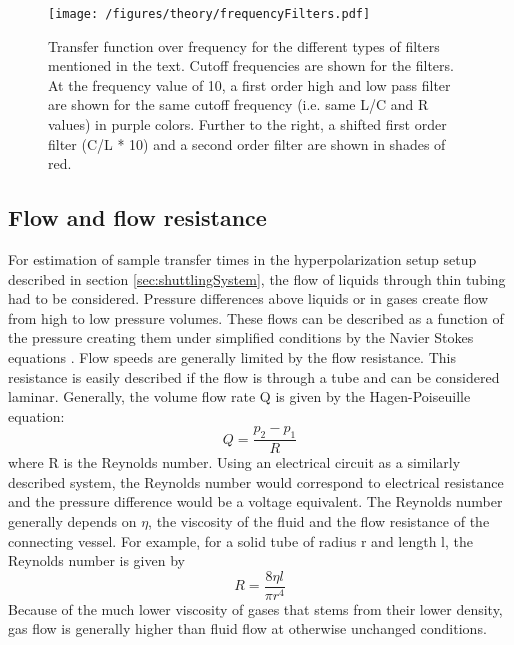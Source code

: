             \begin{figure}
                \centering
                \texttt{[image: /figures/theory/frequencyFilters.pdf]}
                \caption[Frequency filters]{Transfer function over frequency for the different types of filters mentioned in the text. Cutoff frequencies are shown for the filters. At the frequency value of 10, a first order high and low pass filter are shown for the same cutoff frequency (i.e. same L/C and R values) in purple colors. Further to the right, a shifted first order filter (C/L * 10) and a second order filter are shown in shades of red.}
                \label{figure:theory:frequencyFilter}
            \end{figure}
            \subsection{Flow and flow resistance}
                For estimation of sample transfer times in the hyperpolarization setup setup described in section \ref{sec:shuttlingSystem}, the flow of liquids through thin tubing had to be considered.
                Pressure differences above liquids or in gases create flow from high to low pressure volumes. These flows can be   described as a function of the pressure creating them under simplified conditions by the Navier Stokes equations \cite{sochi_flow_2013}.
                Flow speeds are generally limited by the flow resistance. This resistance is easily described if the flow is through a tube and can be considered laminar. Generally, the volume flow rate Q is given by the Hagen-Poiseuille equation:
                \begin{equation}
                    Q=\frac{p_2-p_1}{R}
                \end{equation}
                where R is the Reynolds number. Using an electrical circuit as a similarly described system, the Reynolds number would correspond to electrical resistance and the pressure difference would be a voltage equivalent. The Reynolds number generally depends on $\eta$, the viscosity of the fluid and the flow resistance of the connecting vessel. For example, for a solid tube of radius r and length l, the Reynolds number is given by \cite{jeffrey_particle_1965}
                \begin{equation}
                    R=\frac{8\eta l}{\pi r^4}
                \end{equation}
                Because of the much lower viscosity of gases that stems from their lower density, gas flow is generally higher than fluid flow at otherwise unchanged conditions.
